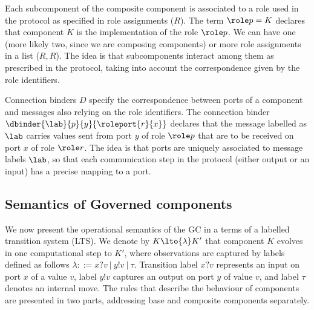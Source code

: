 Each subcomponent of the composite component is associated to a role used in the protocol as specified in role assignments ($R$). The term $\role p=K$ declares that component $K$ is the implementation of the role $\role p$. We can have one (more likely two, since we are composing components) or more role assignments in a list ($R,R$). The idea is that subcomponents interact among them as prescribed in the protocol, taking into account the correspondence given by the role identifiers. 

 Connection binders $D$ specify the correspondence between ports of a component and messages also relying on the role identifiers. 
  The connection binder $\dbinder{\lab}{p}{y} {\roleport{r}{x}}$ declares that the message labelled as $\lab$ carries values sent from port $y$ of role $\role p$ that are to be received on port $x$ of role $\role r$. 
  The idea is that ports are uniquely associated to message labels $\lab$, so that each communication step in the protocol (either output or an input) has a precise mapping to a port.



\subsection{Semantics of Governed components}

We now present the operational semantics of the GC in a terms of a labelled transition system (LTS).  We denote by $K \lto{\lambda} K'$ that component $K$ evolves in one computational step to $K'$, where observations are captured by labels defined as follows $\lambda::=x?v\ |\ y!v\ |\ \tau$. Transition label $x?v$ represents an input on port $x$ of a value $v$, label $y!v$ captures an output on port $y$ of value $v$, and label $\tau$ denotes an internal move. The rules that describe the behaviour of components are presented in two parts, addressing base and composite components separately.

